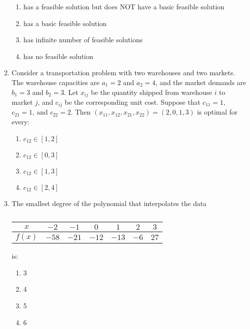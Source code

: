 \documentclass[journal]{IEEEtran}
\numberwithin{equation}{enumi}
\numberwithin{figure}{enumi}
\begin{document}
\begin{enumerate}
    \begin{enumerate}
        \item has a feasible solution but does NOT have a basic feasible solution
        \item has a basic feasible solution
        \item has infinite number of feasible solutions
        \item has no feasible solution
    \end{enumerate}
    
\item  Consider a transportation problem with two warehouses and two markets. The warehouse capacities are $a_1 = 2$ and $a_2 = 4$, and the market demands are $b_1 = 3$ and $b_2 = 3$. Let $x_{ij}$ be the quantity shipped from warehouse $i$ to market $j$, and $c_{ij}$ be the corresponding unit cost. Suppose that $c_{11} = 1$, $c_{21} = 1$, and $c_{22} = 2$. Then $(x_{11}, x_{12}, x_{21}, x_{22}) = (2, 0, 1, 3)$ is optimal for every:
\hfill{}
\begin{multicols}{2}
    \begin{enumerate}
        \item $c_{12} \in [1, 2]$
        \item $c_{12} \in [0, 3]$
        \item  $c_{12} \in [1, 3]$
        \item $c_{12} \in [2, 4]$
    \end{enumerate}
    \end{multicols}


\item The smallest degree of the polynomial that interpolates the data\\

\begin{table}[ht]
\centering
\begin{tabular}{|c|c|c|c|c|c|c|}
\hline      
$x$     & $-2$ & $-1$ & $0$ & $1$ & $2$ & $3$ \\
\hline
$f(x)$  & $-58$ & $-21$ & $-12$ & $-13$ & $-6$ & $27$ \\
\hline

\end{tabular}
\caption{}
\label{tab:Q51}
\end{table}


    is:   \hfill{}
 \begin{multicols}{4}
\begin{enumerate}
    \item 3
    \item 4
    \item 5
    \item 6
\end{enumerate}
\end{multicols}



\end{enumerate}
\end{document}
